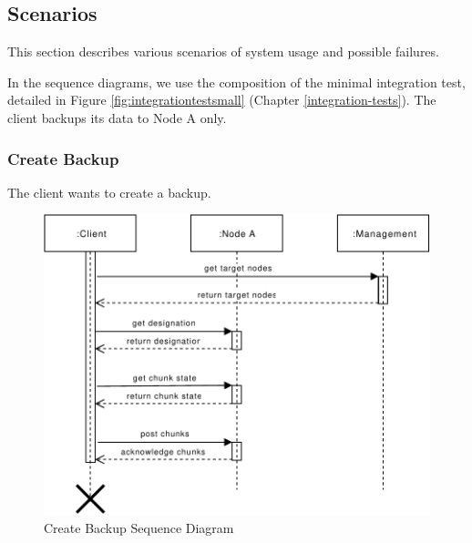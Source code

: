 \subsection{Scenarios}
\label{sec:scenarios}
This section describes various scenarios of system usage and possible failures.

In the sequence diagrams, we use the composition of the minimal integration test, detailed in Figure \ref{fig:integrationtestsmall} (Chapter \ref{integration-tests}). The client backups its data to Node A only.

\subsubsection{Create Backup}\label{sec:scenario-create-backup}
The client wants to create a backup.

\begin{figure}[h]
    \centering
    \includegraphics[width=\linewidth]{resources/create_backup}
    \caption{Create Backup Sequence Diagram}
    \label{fig:create-backup}
\end{figure}

